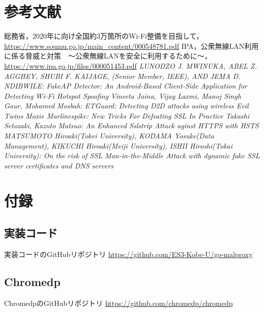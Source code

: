 \documentclass[dvipdfmx,twocolumn,9pt]{jsarticle}
\begin{document}
    \section{参考文献}
        \begin{thebibliography}{9}
             総務省，2020年に向け全国約3万箇所のWi-Fi整備を目指して，\url{https://www.soumu.go.jp/main_content/000548781.pdf}
             IPA，公衆無線LAN利用に係る脅威と対策　～公衆無線LANを安全に利用するために～，\url{https://www.ipa.go.jp/files/000051453.pdf}
             \textit{LUNODZO J. MWINUKA, ABEL Z. AGGHEY, SHUBI F. KAIJAGE, (Senior Member, IEEE), AND JEMA D. NDIBWILE: FakeAP Detector: An Android-Based Client-Side Application for Detecting Wi-Fi Hotspot Spoofing}
             \textit{Vineeta Jaina, Vijay Laxmi, Manoj Singh Gaur, Mohamed Mosbah: ETGuard: Detecting D2D attacks using wireless Evil Twins}
             \textit{Moxie Marlinespike: New Tricks For Defeating SSL In Practice}
             \textit{Takashi Setozaki, Kazuto Matsuo: An Enhanced Sslstrip Attack aginst HTTPS with HSTS}
             \textit{MATSUMOTO Hiroaki(Tokei University), KODAMA Yosuke(Data Management), KIKUCHI Hiroaki(Meiji University), ISHII Hiroshi(Tokai University): On the risk of SSL Man-in-the-Middle Attack with dynamic fake SSL server certificates and DNS servers}
        \end{thebibliography}
        
    \section{付録}
        \subsection{実装コード}
            実装コードのGitHubリポジトリ \url{https://github.com/ES3-Kobe-U/go-malproxy}
        \subsection{Chromedp}
            ChromedpのGitHubリポジトリ \url{https://github.com/chromedp/chromedp}
\end{document}
